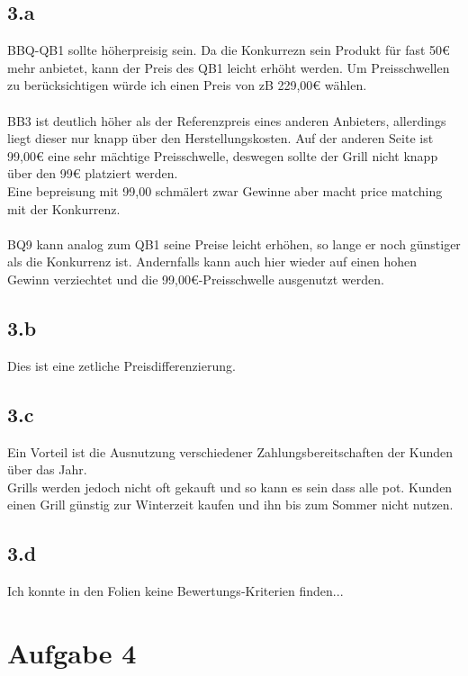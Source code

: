 \subsection{3.a}
    BBQ-QB1 sollte höherpreisig sein. Da die Konkurrezn sein Produkt für fast 50€ mehr anbietet, kann der Preis des QB1 leicht erhöht werden. Um Preisschwellen zu berücksichtigen würde ich einen Preis von zB 229,00€ wählen. \\
    \ \\
    BB3 ist deutlich höher als der Referenzpreis eines anderen Anbieters, allerdings liegt dieser nur knapp über den Herstellungskosten. Auf der anderen Seite ist 99,00€ eine sehr mächtige Preisschwelle, deswegen sollte der Grill nicht knapp über den 99€ platziert werden. \\
    Eine bepreisung mit 99,00 schmälert zwar Gewinne aber macht price matching mit der Konkurrenz. \\
    \ \\
    BQ9 kann analog zum QB1 seine Preise leicht erhöhen, so lange er noch günstiger als die Konkurrenz ist. Andernfalls kann auch hier wieder auf einen hohen Gewinn verziechtet und die 99,00€-Preisschwelle ausgenutzt werden. \\

\subsection{3.b}
    Dies ist eine zetliche Preisdifferenzierung.

\subsection{3.c}
    Ein Vorteil ist die Ausnutzung verschiedener Zahlungsbereitschaften der Kunden über das Jahr. \\
    Grills werden jedoch nicht oft gekauft und so kann es sein dass alle pot. Kunden einen Grill günstig zur Winterzeit kaufen und ihn bis zum Sommer nicht nutzen. \\

\subsection{3.d}
    Ich konnte in den Folien keine Bewertungs-Kriterien finden...



\section{Aufgabe 4}
